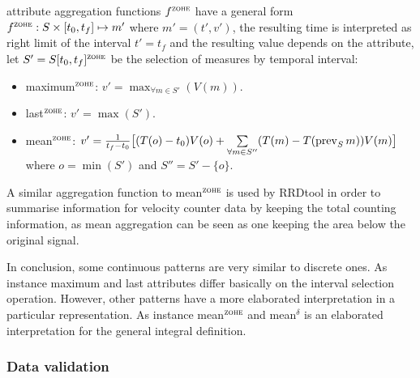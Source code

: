 \zohe{} attribute aggregation functions $f^\zohe{}$ have a general
form $f^\zohe{} : S \times [t_0,t_f]\mapsto m'$ where $m'=(t',v')$,
the resulting time is interpreted as right limit of the interval
$t'=t_f$ and the resulting value depends on the attribute, let
$S'=S[t_0,t_f]^\zohe{}$ be the selection of measures by \zohe{} temporal
interval:
\begin{itemize}
\item maximum$^\zohe{}$: $v' = \max_{\forall m \in S'}(V(m))$. 
\item last$^\zohe{}$: $v' = \max(S')$.
\item mean$^\zohe{}$: $v' = \frac{1}{t_f-t_0} \big[ (T(o)-t_0)V(o) +
  \sum\limits_{\forall m \in S''}( T(m)- T(\operatorname*{prev}_S
  m) )V(m) \big]$ where $o=\min(S')$ and $S''= S' - \{o\}$.
\end{itemize}

A similar aggregation function to mean$^\zohe{}$ is used by RRDtool
\cite{rrdtool} in order to summarise information for velocity counter
data by keeping the total counting information, as mean aggregation
can be seen as one keeping the area below the original signal.


In conclusion, some continuous patterns are very similar to discrete
ones. As instance maximum and last attributes differ basically on the
interval selection operation. However, other patterns have a more
elaborated interpretation in a particular representation. As instance
mean$^\zohe{}$ and mean$^\delta$ is an elaborated interpretation for
the general integral definition.




\subsubsection{Data validation}



